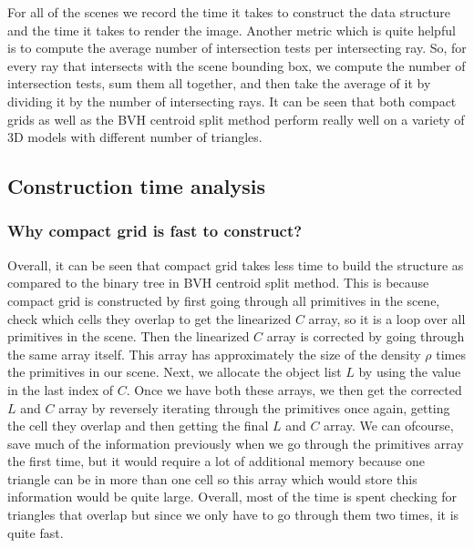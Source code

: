 \documentclass[11pt,a4paper]{article}
\begin{document}
For all of the scenes we record the time it takes to construct the data structure and the time it takes to render the image. Another metric which is quite helpful is to compute the average number of intersection tests per intersecting ray. So, for every ray that intersects with the scene bounding box, we compute the number of intersection tests, sum them all together, and then take the average of it by dividing it by the number of intersecting rays. It can be seen that both compact grids as well as the BVH centroid split method perform really well on a variety of 3D models with different number of triangles. 

\subsection{Construction time analysis}
\subsubsection{Why compact grid is fast to construct?}
Overall, it can be seen that compact grid takes less time to build the structure as compared to the binary tree in BVH centroid split method. This is because compact grid is constructed by first going through all primitives in the scene, check which cells they overlap to get the linearized $C$ array, so it is a loop over all primitives in the scene. Then the linearized $C$ array is corrected by going through the same array itself. This array has approximately the size of the density $\rho$ times the primitives in our scene. Next, we allocate the object list $L$ by using the value in the last index of $C$. Once we have both these arrays, we then get the corrected $L$ and $C$ array by reversely iterating through the primitives once again, getting the cell they overlap and then getting the final $L$ and $C$ array. We can ofcourse, save much of the information previously when we go through the primitives array the first time, but it would require a lot of additional memory because one triangle can be in more than one cell so this array which would store this information would be quite large. Overall, most of the time is spent checking for triangles that overlap but since we only have to go through them two times, it is quite fast.
\end{document}
